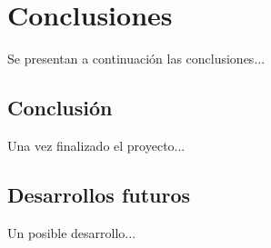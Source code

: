 \chapter{Conclusiones}

Se presentan a continuación las conclusiones...

\section{Conclusión}

Una vez finalizado el proyecto...

\section{Desarrollos futuros}

Un posible desarrollo...